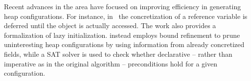 Recent advances in the area have focused on improving efficiency in generating heap configurations. For instance, in~\cite{DLR-ASE12} the concretization of a reference variable is deferred until the object is actually accessed. The work also provides a formalization of lazy initialization. \cite{BLISS-TSE15} instead employs bound refinement to prune uninteresting heap configurations by using information from already concretized fields, while a SAT solver is used to check whether declarative -- rather than imperative as in the original algorithm -- preconditions hold for a given configuration.



